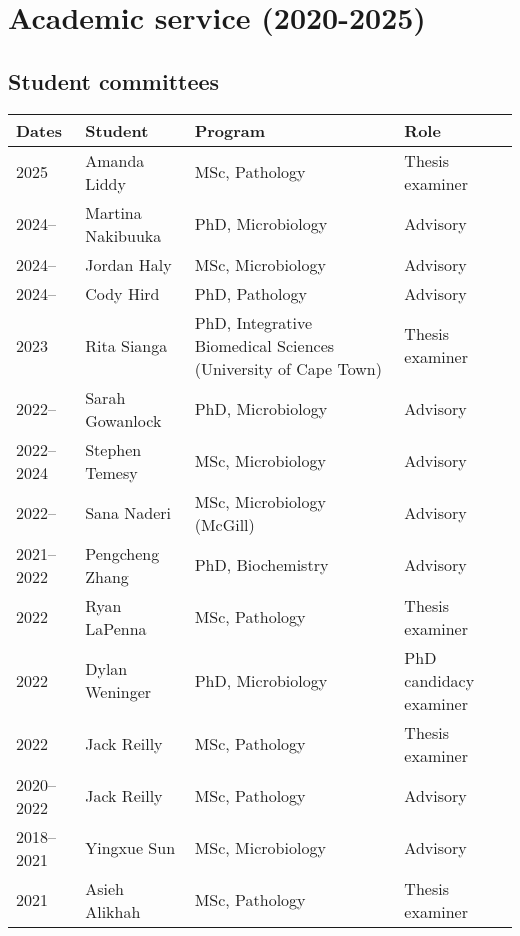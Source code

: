 
\clearpage
\section {Academic service (2020-2025)}


\subsection  {\hspace{-1in} Student committees}

\begin{tabular}{lp{1.3in}p{2.4in}p{1.4in}}
Dates & Student & Program & Role\\
\hline

2025 & Amanda Liddy & MSc, Pathology & Thesis examiner\\

2024-- & Martina Nakibuuka & PhD, Microbiology & Advisory\\

2024-- & Jordan Haly & MSc, Microbiology & Advisory\\
2024-- & Cody Hird & PhD, Pathology & Advisory\\

2023 & Rita Sianga & PhD, Integrative Biomedical Sciences (University of Cape Town) & Thesis examiner\\

2022-- & Sarah Gowanlock & PhD, Microbiology & Advisory\\
2022--2024 & Stephen Temesy & MSc, Microbiology & Advisory\\
2022-- & Sana Naderi & MSc, Microbiology (McGill) & Advisory\\
2021--2022 & Pengcheng Zhang & PhD, Biochemistry & Advisory\\

2022 & Ryan LaPenna & MSc, Pathology & Thesis examiner\\
2022 & Dylan Weninger & PhD, Microbiology & PhD candidacy examiner\\
2022 & Jack Reilly & MSc, Pathology & Thesis examiner\\

2020--2022 & Jack Reilly & MSc, Pathology & Advisory\\

2018--2021 & Yingxue Sun & MSc, Microbiology & Advisory\\

2021 & Asieh Alikhah & MSc, Pathology & Thesis examiner\\


\end{tabular}
